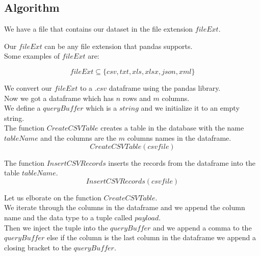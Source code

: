 \subsection{Algorithm}

We have a file that contains our dataset in the file extension $fileExt$.

Our $fileExt$ can be any file extension that pandas supports. \\

Some examples of $fileExt$ are:

\begin{equation}
    fileExt \subseteq \{csv, txt, xls, xlsx, json, xml\}
\end{equation}


We convert our $fileExt$ to a $.csv$ dataframe using the pandas library. \\

Now we got a dataframe which has $n$ rows and $m$ columns. \\

We define a $queryBuffer$ which is a $string$ and we initialize it to an empty string. \\

The function $CreateCSVTable$ creates a table in the database with the name $tableName$ and the columns are the $m$ columns names in the dataframe. \\

\begin{equation}
    CreateCSVTable(csvfile)
\end{equation}

The function $InsertCSVRecords$ inserts the records from the dataframe into the table $tableName$. \\

\begin{equation}
    InsertCSVRecords(csvfile)
\end{equation}

Let us elborate on the function $CreateCSVTable$. \\

We iterate through the columns in the dataframe and we append the column name and the data type to a tuple called $payload$. \\

Then we inject the tuple into the $queryBuffer$ and we append a comma to the $queryBuffer$ else if the column is the last column in the dataframe we append a closing bracket to the $queryBuffer$. \\


